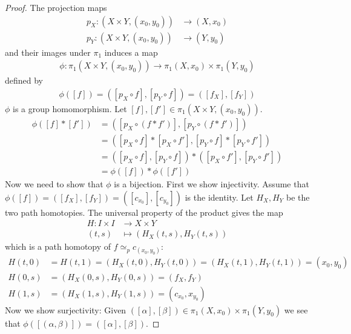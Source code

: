 \begin{proof}
The projection maps
\begin{align*}
  p_X: (X \times Y, (x_0, y_0)) &\to (X, x_0) \\
  p_Y: (X \times Y, (x_0, y_0)) &\to (Y, y_0)
\end{align*}
and their images under \( \pi_1 \) induces a
map
\begin{align*}
   \phi: \pi_1(X \times Y, (x_0, y_0)) \to \pi_1(X, x_0) \times \pi_1(Y, y_0)
\end{align*}
defined by
\begin{align}
  \phi([f]) = ([p_X \circ f], [p_Y \circ f]) = ([f_X], [f_Y])
\end{align}
\( \phi \) is a group homomorphism. Let \( [f], [f'] \in \pi_1(X \times Y, (x_0, y_0)) \).
\begin{align*}
  \phi([f] * [f']) &= ([p_X \circ (f*f')], [p_Y \circ (f*f')]) \\
                   &= ([p_X \circ f] * [p_X \circ f'], [p_Y \circ f] * [p_Y \circ f']) \\
                   &= ([p_X \circ f], [p_Y \circ f]) * ([p_X \circ f'], [p_Y \circ f']) \\
                   &= \phi([f])*\phi([f'])
\end{align*}
Now we need to show that \( \phi \) is a bijection.
First we show injectivity.
Assume that \( \phi([f]) = ([f_X], [f_Y]) = ([c_{x_0}], [c_{y_0}]) \) is the identity.
Let \( H_X, H_Y \) be the two path homotopies.
The universal property of the product gives the map
\begin{align*}
  H: I \times I &\to X \times Y \\
  (t, s) &\mapsto (H_X(t, s), H_Y(t, s))
\end{align*}
which is a path homotopy of \( f \simeq_p c_{(x_0, y_0)} \):
\begin{align*}
  H(t, 0) &= H(t, 1) = (H_X(t, 0), H_Y(t, 0)) = (H_X(t, 1), H_Y(t, 1)) = (x_0, y_0) \\
  H(0, s) &= (H_X(0, s), H_Y(0, s)) = (f_X, f_Y) \\
  H(1, s) &= (H_X(1, s), H_Y(1, s)) = (c_{x_0}, x_{y_0})
\end{align*}
Now we show surjectivity:
Given \( ([\alpha], [\beta]) \in \pi_1(X, x_0) \times \pi_1(Y, y_0) \)
we see that \( \phi([(\alpha, \beta)]) = ([\alpha], [\beta]) \).
\end{proof}

